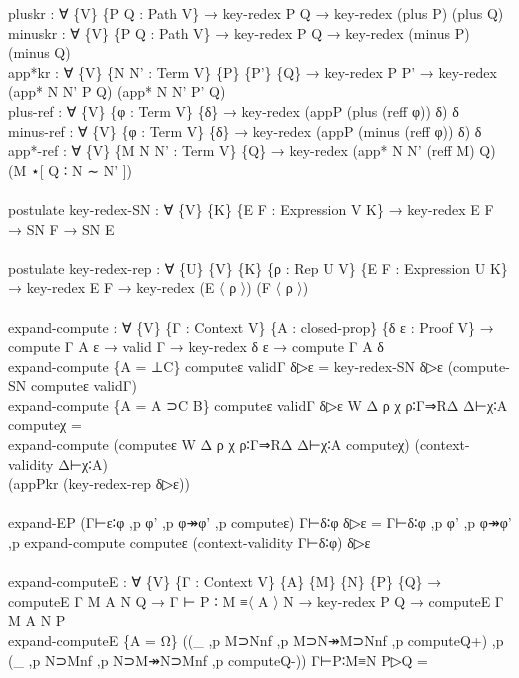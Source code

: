 {\begin{code}
{\>  pluskr : ∀ \{V\} \{P Q : Path V\} → key-redex P Q → key-redex (plus P) (plus Q)\<\\
\>  minuskr : ∀ \{V\} \{P Q : Path V\} → key-redex P Q → key-redex (minus P) (minus Q)\<\\
\>  app*kr : ∀ \{V\} \{N N' : Term V\} \{P\} \{P'\} \{Q\} → key-redex P P' → key-redex (app* N N' P Q) (app* N N' P' Q)\<\\
\>  plus-ref : ∀ \{V\} \{φ : Term V\} \{δ\} → key-redex (appP (plus (reff φ)) δ) δ\<\\
\>  minus-ref : ∀ \{V\} \{φ : Term V\} \{δ\} → key-redex (appP (minus (reff φ)) δ) δ\<\\
\>  app*-ref : ∀ \{V\} \{M N N' : Term V\} \{Q\} → key-redex (app* N N' (reff M) Q) (M ⋆[ Q ∶ N ∼ N' ])\<\\
\>\<\\
\>postulate key-redex-SN : ∀ \{V\} \{K\} \{E F : Expression V K\} → key-redex E F → SN F → SN E\<\\
\>\<\\
\>postulate key-redex-rep : ∀ \{U\} \{V\} \{K\} \{ρ : Rep U V\} \{E F : Expression U K\} → key-redex E F → key-redex (E 〈 ρ 〉) (F 〈 ρ 〉)\<\\
\>\<\\
\>expand-compute : ∀ \{V\} \{Γ : Context V\} \{A : closed-prop\} \{δ ε : Proof V\} →\<\\
\>                compute Γ A ε → valid Γ → key-redex δ ε → compute Γ A δ\<\\
\>expand-compute \{A = ⊥C\} computeε validΓ δ▷ε = key-redex-SN δ▷ε (compute-SN computeε validΓ)\<\\
\>expand-compute \{A = A ⊃C B\} computeε validΓ δ▷ε W Δ ρ χ ρ∶Γ⇒RΔ Δ⊢χ∶A computeχ = \<\\
\>  expand-compute (computeε W Δ ρ χ ρ∶Γ⇒RΔ Δ⊢χ∶A computeχ) (context-validity Δ⊢χ∶A)\<\\
\>      (appPkr (key-redex-rep δ▷ε)) \<\\
\>\<\\
\>expand-EP (Γ⊢ε∶φ ,p φ' ,p φ↠φ' ,p computeε) Γ⊢δ∶φ δ▷ε = Γ⊢δ∶φ ,p φ' ,p φ↠φ' ,p expand-compute computeε (context-validity Γ⊢δ∶φ) δ▷ε\<\\
\>\<\\
\>expand-computeE : ∀ \{V\} \{Γ : Context V\} \{A\} \{M\} \{N\} \{P\} \{Q\} →\<\\
\>  computeE Γ M A N Q → Γ ⊢ P ∶ M ≡〈 A 〉 N → key-redex P Q → computeE Γ M A N P\<\\
\>expand-computeE \{A = Ω\} ((\_ ,p M⊃Nnf ,p M⊃N↠M⊃Nnf ,p computeQ+) ,p (\_ ,p N⊃Mnf ,p N⊃M↠N⊃Mnf ,p computeQ-)) Γ⊢P∶M≡N P▷Q = \<\\
}
\end{code}}

